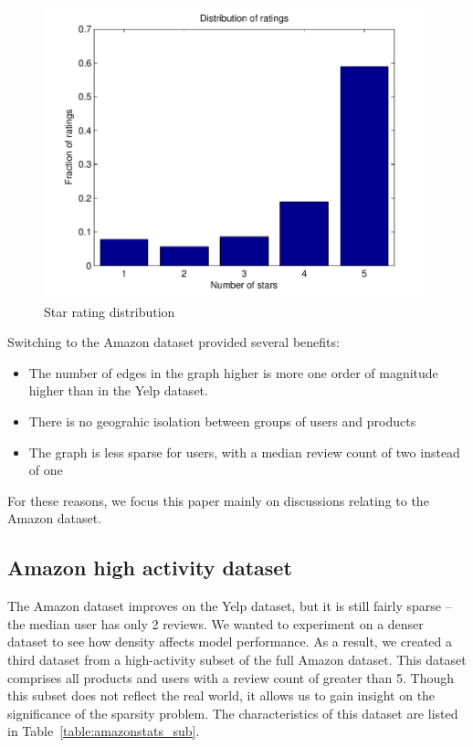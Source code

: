 \documentclass[letterpaper, 11 pt, conference]{ieeeconf}
\begin{document}
\begin{figure}[h]
\includegraphics[scale=0.6]{images/ratings.pdf}
\caption{Star rating distribution}
\label{fig:ratings}
\end{figure}


Switching to the Amazon dataset provided several benefits:
\begin{itemize}
\item The number of edges in the graph higher is more one order of magnitude 
higher than in the Yelp dataset.
\item There is no geograhic isolation between groups of users and products
\item The graph is less sparse for users, with a median review count of two 
instead of one
\end{itemize}
For these reasons, we focus this paper mainly on discussions relating to the 
Amazon dataset.

\subsection{Amazon high activity dataset}
The Amazon dataset improves on the Yelp dataset, but it is still fairly 
sparse -- the median user has only 2 reviews. We wanted to experiment on a 
denser dataset to see how density affects model performance. 
As a result, we created a third dataset from a high-activity 
subset of the full Amazon dataset. This dataset comprises all products and 
users with a review count of greater than 5. Though this subset does not 
reflect the real world, it allows us to gain insight on the significance of the 
sparsity problem. The characteristics of this dataset are listed in 
Table~\ref{table:amazonstats_sub}.
\end{document}
